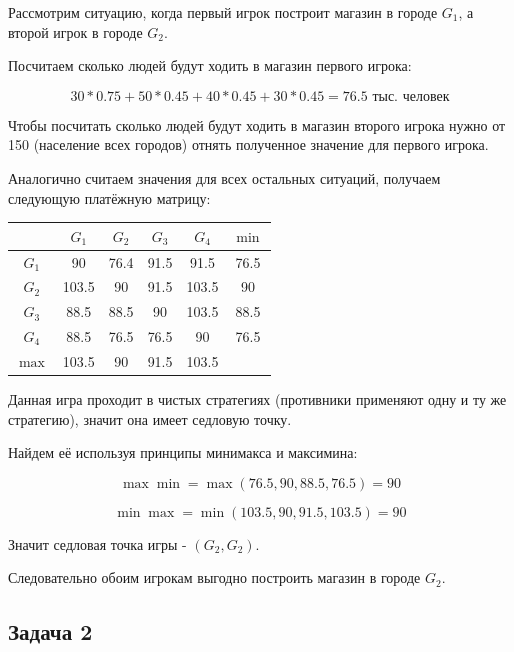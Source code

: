 \documentclass[11pt, a4paper]{article}
\begin{document}
    Рассмотрим ситуацию, когда первый игрок построит магазин в городе $G_1$,
    а второй игрок в городе $G_2$.

    Посчитаем сколько людей будут ходить в магазин первого игрока:

    \begin{equation}
        30 * 0.75 + 50 * 0.45 + 40 * 0.45 + 30 * 0.45 = 76.5\label{eq:equation9}
        \text{ тыс. человек}
    \end{equation}

    Чтобы посчитать сколько людей будут ходить в магазин второго игрока нужно от 150 (население всех городов)
    отнять полученное значение для первого игрока.

    Аналогично считаем значения для всех остальных ситуаций, получаем следующую платёжную матрицу:
    \begin{table}[h]
        \centering
        \begin{tabular}{|c|c|c|c|c|c|}
            \hline
            & $G_1$ & $G_2$ & $G_3$ & $G_4$ & $\min$ \\
            \hline
            $G_1$  & 90    & 76.4  & 91.5  & 91.5  & 76.5   \\
            \hline
            $G_2$  & 103.5 & 90    & 91.5  & 103.5 & 90     \\
            \hline
            $G_3$  & 88.5  & 88.5  & 90    & 103.5 & 88.5   \\
            \hline
            $G_4$  & 88.5  & 76.5  & 76.5  & 90    & 76.5   \\
            \hline
            $\max$ & 103.5 & 90    & 91.5  & 103.5 &        \\
            \hline
        \end{tabular}\label{tab:table}
    \end{table}

    Данная игра проходит в чистых стратегиях (противники применяют одну и ту же стратегию), значит она имеет седловую точку.

    Найдем её используя принципы минимакса и максимина:

    \begin{equation}
        \max\min = \max(76.5, 90, 88.5, 76.5) = 90\label{eq:equation10}
    \end{equation}

    \begin{equation}
        \min\max = \min(103.5, 90, 91.5, 103.5) = 90\label{eq:equation11}
    \end{equation}

    Значит седловая точка игры - $(G_2, G_2)$.

    Следовательно обоим игрокам выгодно построить магазин в городе $G_2$.
    \newpage

    \subsection{Задача 2}\label{subsec:task2}
\end{document}
